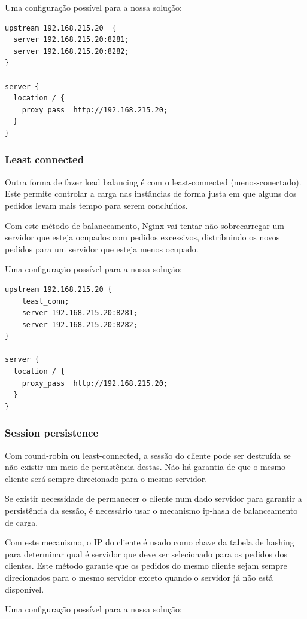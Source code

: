 \documentclass[pdftex,12pt,a4paper]{report}
\begin{document}
Uma configuração possível para a nossa solução:

\begin{lstlisting}
upstream 192.168.215.20  {
  server 192.168.215.20:8281;
  server 192.168.215.20:8282;
}

server {
  location / {
    proxy_pass  http://192.168.215.20;
  }
}
\end{lstlisting}

\subsubsection{Least connected}
Outra forma de fazer load balancing é com o least-connected (menos-conectado). Este permite controlar a carga nas instâncias de forma justa em que alguns dos pedidos levam mais tempo para serem concluídos.

Com este método de balanceamento, Nginx vai tentar não sobrecarregar um servidor que esteja ocupados com pedidos excessivos, distribuindo os novos pedidos para um servidor que esteja menos ocupado.

Uma configuração possível para a nossa solução:

\begin{lstlisting}
upstream 192.168.215.20 {
	least_conn;
    server 192.168.215.20:8281;
    server 192.168.215.20:8282;
}

server {
  location / {
    proxy_pass  http://192.168.215.20;
  }
}
\end{lstlisting}

\subsubsection{Session persistence}
Com round-robin ou least-connected, a sessão do cliente pode ser destruída se não existir um meio de persistência destas. Não há garantia de que o mesmo cliente será sempre direcionado para o mesmo servidor.

Se existir necessidade de permanecer o cliente num dado servidor para garantir a persistência da sessão, é necessário usar o mecanismo ip-hash de balanceamento de carga.

Com este mecanismo, o IP do cliente é usado como chave da tabela de hashing para determinar qual é servidor que deve ser selecionado para os pedidos dos clientes. Este método garante que os pedidos do mesmo cliente sejam sempre direcionados para o mesmo servidor exceto quando o servidor já não está disponível.

Uma configuração possível para a nossa solução:
\end{document}
